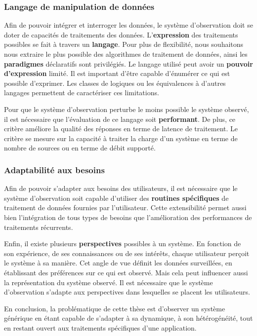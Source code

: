 \subsubsection{Langage de manipulation de données}
Afin de pouvoir intégrer et interroger les données, le système d'observation doit se doter de capacités de traitements des données. L'\textbf{expression} des traitements possibles se fait à travers un \textbf{langage}. Pour plus de flexibilité, nous souhaitons nous extraire le plus possible des algorithmes de traitement de données, ainsi les \textbf{paradigmes} déclaratifs sont privilégiés. Le langage utilisé peut avoir un \textbf{pouvoir d'expression} limité. Il est important d'être capable d'énumérer ce qui est possible d'exprimer. Les classes de logiques ou les équivalences à d'autres langages permettent de caractériser ces limitations.

Pour que le système d'observation perturbe le moins possible le système observé, il est nécessaire que l'évaluation de ce langage soit \textbf{performant}. De plus, ce critère améliore la qualité des réponses en terme de latence de traitement. Le critère se mesure sur la capacité à traiter la charge d'un système en terme de nombre de sources ou en terme de débit supporté.

\subsubsection{Adaptabilité aux besoins}
Afin de pouvoir s'adapter aux besoins des utilisateurs, il est nécessaire que le système d'observation soit capable d'utiliser des \textbf{routines spécifiques} de traitement de données fournies par l'utilisateur. Cette extensibilité permet aussi bien l'intégration de tous types de besoins que l'amélioration des performances de traitements récurrents.

Enfin, il existe plusieurs \textbf{perspectives} possibles à un système. En fonction de son expérience, de ses connaissances ou de ses intérêts, chaque utilisateur perçoit le système à sa manière. Cet angle de vue définit les données surveillées, en établissant des préférences sur ce qui est observé. Mais cela peut influencer aussi la représentation du système observé. Il est nécessaire que le système d'observation s'adapte aux perspectives dans lesquelles se placent les utilisateurs.

En conclusion, la problématique de cette thèse est d'observer un système générique en étant capable de s'adapter à sa dynamique, à son hétérogénéité, tout en restant ouvert aux traitements spécifiques d'une application.
